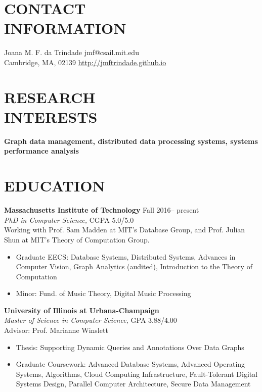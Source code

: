 \documentclass[line,margin]{res}
\begin{document}

\begin{resume}

\section{CONTACT \\ INFORMATION}  Joana M. F. da Trindade \hfill jmf@csail.mit.edu \\
  Cambridge, MA, 02139 \hfill \url{http://jmftrindade.github.io}

\section{RESEARCH \\ INTERESTS} \textbf{Graph data management, distributed data processing systems, systems performance analysis}

\section{EDUCATION} \textbf{Massachusetts Institute of Technology} \hfill Fall 2016-- present \\
  {\sl PhD in Computer Science,} CGPA 5.0/5.0 \\
  Working with Prof. Sam Madden at MIT's Database Group, and Prof. Julian Shun at MIT's Theory of Computation Group.
  \begin{itemize}  \itemsep -2pt
  \item Graduate EECS: Database Systems, Distributed Systems, Advances in Computer Vision, Graph Analytics (audited), Introduction to the Theory of Computation
  \item Minor: Fund. of Music Theory, Digital Music Processing
  \end{itemize}

  \textbf{University of Illinois at Urbana-Champaign} \\ %
  {\sl Master of Science in Computer Science,}  GPA 3.88/4.00 \\
  Advisor: Prof. Marianne Winslett
  \begin{itemize}  \itemsep -2pt
  \item Thesis: Supporting Dynamic Queries and Annotations Over Data Graphs
  \item Graduate Coursework: Advanced Database Systems, Advanced Operating Systems, Algorithms, Cloud Computing Infrastructure, Fault-Tolerant Digital Systems Design, Parallel Computer Architecture, Secure Data Management
  \end{itemize}


\end{resume}
\end{document}
